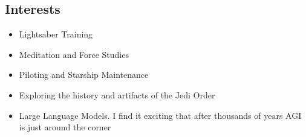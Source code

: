 \documentclass[11pt,a4paper]{moderncv}
\begin{document}
\begin{flushleft}
		\section{Interests}
		{\begin{itemize}[leftmargin=0.8cm, , rightmargin=0.3cm, label=\textbullet]
				\item Lightsaber Training
				\item Meditation and Force Studies
				\item Piloting and Starship Maintenance
				\item Exploring the history and artifacts of the Jedi Order
				\item Large Language Models. I find it exciting that after thousands of years AGI is just around the corner
		\end{itemize}} 
	\end{flushleft}  	
\end{document}
